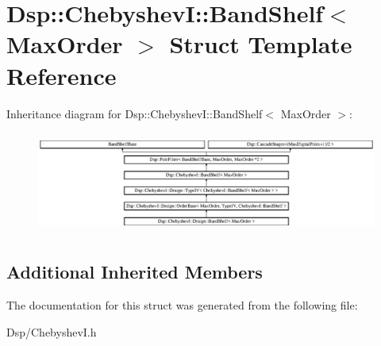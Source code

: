 \hypertarget{structDsp_1_1ChebyshevI_1_1BandShelf}{\section{Dsp\-:\-:Chebyshev\-I\-:\-:Band\-Shelf$<$ Max\-Order $>$ Struct Template Reference}
\label{structDsp_1_1ChebyshevI_1_1BandShelf}
}
Inheritance diagram for Dsp\-:\-:Chebyshev\-I\-:\-:Band\-Shelf$<$ Max\-Order $>$\-:\begin{figure}[H]
\begin{center}
\leavevmode
\includegraphics[height=3.366734cm]{structDsp_1_1ChebyshevI_1_1BandShelf}
\end{center}
\end{figure}
\subsection*{Additional Inherited Members}


The documentation for this struct was generated from the following file\-:\begin{DoxyCompactItemize}
\item 
Dsp/Chebyshev\-I.\-h\end{DoxyCompactItemize}
